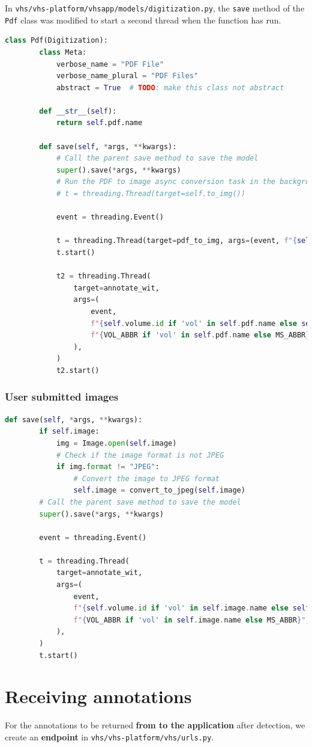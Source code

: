 		In \texttt{vhs/vhs-platform/vhsapp/models/digitization.py}, the \texttt{save} method of the \texttt{Pdf} class was modified to start a second thread when the function has run.
		
		\begin{lstlisting}[language=Python]
	class Pdf(Digitization):
		class Meta:
			verbose_name = "PDF File"
			verbose_name_plural = "PDF Files"
			abstract = True  # TODO: make this class not abstract
		
		def __str__(self):
			return self.pdf.name
		
		def save(self, *args, **kwargs):
			# Call the parent save method to save the model
			super().save(*args, **kwargs)
			# Run the PDF to image async conversion task in the background using threading
			# t = threading.Thread(target=self.to_img())
	
			event = threading.Event()
			
			t = threading.Thread(target=pdf_to_img, args=(event, f"{self.pdf.name}",))
			t.start()
		
			t2 = threading.Thread(
				target=annotate_wit,
				args=(
					event,
					f"{self.volume.id if 'vol' in self.pdf.name else self.manuscript.id}",
					f"{VOL_ABBR if 'vol' in self.pdf.name else MS_ABBR}",
				),
			)
			t2.start()\end{lstlisting}

		\subsubsection{User submitted images}
		\begin{lstlisting}[language=Python]
	def save(self, *args, **kwargs):
		if self.image:
			img = Image.open(self.image)
			# Check if the image format is not JPEG
			if img.format != "JPEG":
				# Convert the image to JPEG format
				self.image = convert_to_jpeg(self.image)
		# Call the parent save method to save the model
		super().save(*args, **kwargs)
		
		event = threading.Event()
	
		t = threading.Thread(
			target=annotate_wit,
			args=(
				event,
				f"{self.volume.id if 'vol' in self.image.name else self.manuscript.id}",
				f"{VOL_ABBR if 'vol' in self.image.name else MS_ABBR}",
			),
		)
		t.start()\end{lstlisting}
		
\section{Receiving annotations}
For the annotations to be returned \textbf{from \exapi to the \eida application} after detection, we create an \textbf{endpoint} in \texttt{vhs/vhs-platform/vhs/urls.py}.

